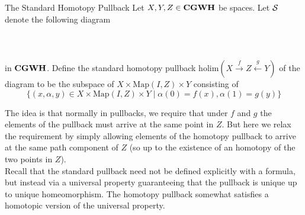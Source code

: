 \documentclass[a4paper]{article}
\begin{document}
\begin{defn}{The Standard Homotopy Pullback}{} Let $X,Y,Z\in\bold{CGWH}$ be spaces. Let $\mathcal{S}$ denote the following diagram \\~\\
\\~\\
in $\bold{CGWH}$. Define the standard homotopy pullback $\text{holim}(X\overset{f}{\rightarrow}Z\overset{g}{\leftarrow}Y)$ of the diagram to be the subspace of $X\times\text{Map}(I,Z)\times Y$ consisting of $$\{(x,\alpha,y)\in X\times\text{Map}(I,Z)\times Y\;|\;\alpha(0)=f(x),\alpha(1)=g(y)\}$$
\end{defn}

The idea is that normally in pullbacks, we require that under $f$ and $g$ the elements of the pullback must arrive at the same point in $Z$. But here we relax the requirement by simply allowing elements of the homotopy pullback to arrive at the same path component of $Z$ (so up to the existence of an homotopy of the two points in $Z$). \\

Recall that the standard pullback need not be defined explicitly with a formula, but instead via a universal property guaranteeing that the pullback is unique up to unique homeomorphism. The homotopy pullback somewhat satisfies a homotopic version of the universal property. 
\end{document}
